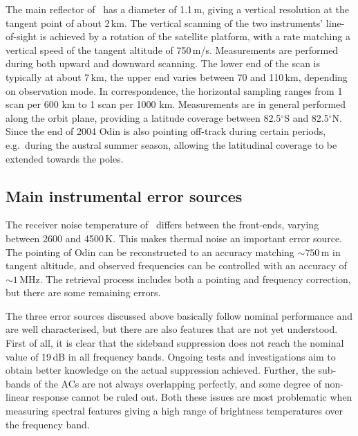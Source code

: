 The main reflector of \smr\ has a diameter of 1.1\,m, giving a
vertical resolution at the tangent point of about 2\,km. The vertical scanning
of the two instruments' line-of-sight is achieved by a rotation of the satellite
platform, with a rate matching a vertical speed of the tangent altitude of
750\,m/s. Measurements are performed during both upward and downward scanning.
The lower end of the scan is typically at about 7\,km, the upper end varies
between 70 and 110\,km, depending on observation mode. In correspondence,
the horizontal sampling ranges from 1 scan per 600 km to 1 scan per 1000 km.
Measurements are in general performed along the orbit plane, providing a
latitude coverage between 82.5$^{\circ}$S and 82.5$^{\circ}$N. Since the end of
2004 Odin is also pointing off-track during certain periods, e.g.\ during the
austral summer season, allowing the latitudinal coverage to be extended towards
the poles. 


\subsection{Main instrumental error sources}
\label{sec:smr:errors}
%
The receiver noise temperature of \smr\ differs between the front-ends, varying
between 2600 and 4500\,K. This makes thermal noise an important error source.
The pointing of Odin can be reconstructed to an accuracy matching
$\sim 750$\,m in tangent altitude, and observed frequencies
can be controlled with an accuracy of $\sim 1$\,MHz. The retrieval process includes both a pointing
and frequency correction, but there are some remaining errors.

The three error sources discussed above basically follow nominal performance
and are well characterised, but there are also features that are not yet
understood. First of all, it is clear that the sideband suppression does not
reach the nominal value of 19\,dB in all frequency bands. Ongoing tests and
investigations aim to obtain better knowledge on the actual suppression achieved.
Further, the sub-bands of the ACs are not always overlapping perfectly, and
some degree of non-linear response cannot be ruled out. Both these issues are
most problematic when measuring spectral features giving a high range of
brightness temperatures over the frequency band.

